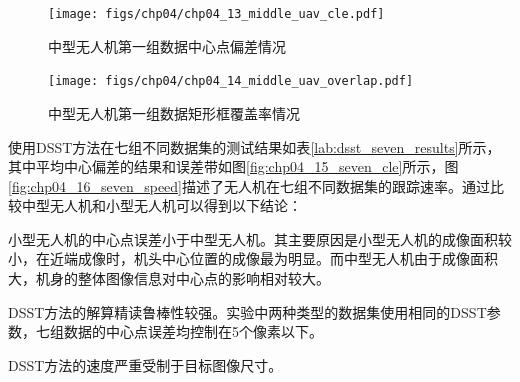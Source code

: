 \begin{figure}[ht]   
	\centering
	\texttt{[image: figs/chp04/chp04\_13\_middle\_uav\_cle.pdf]}
	\caption{中型无人机第一组数据中心点偏差情况}
	\label{fig:chp04_13_middle_uav_cle}
\end{figure}

\begin{figure}[ht]   
	\centering
	\texttt{[image: figs/chp04/chp04\_14\_middle\_uav\_overlap.pdf]}
	\caption{中型无人机第一组数据矩形框覆盖率情况}
	\label{fig:chp04_14_middle_uav_overlap}
\end{figure}

使用DSST方法在七组不同数据集的测试结果如表\ref{lab:dsst_seven_results}所示，其中平均中心偏差的结果和误差带如图\ref{fig:chp04_15_seven_cle}所示，图\ref{fig:chp04_16_seven_speed}描述了无人机在七组不同数据集的跟踪速率。通过比较中型无人机和小型无人机可以得到以下结论：
\begin{compactenum}
	\item 小型无人机的中心点误差小于中型无人机。其主要原因是小型无人机的成像面积较小，在近端成像时，机头中心位置的成像最为明显。而中型无人机由于成像面积大，机身的整体图像信息对中心点的影响相对较大。
	\item DSST方法的解算精读鲁棒性较强。实验中两种类型的数据集使用相同的DSST参数，七组数据的中心点误差均控制在5个像素以下。	
	\item DSST方法的速度严重受制于目标图像尺寸。
\end{compactenum}

